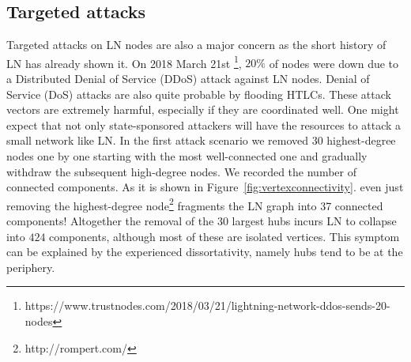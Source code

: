 \documentclass[runningheads]{llncs}
\begin{document}
\subsection{Targeted attacks}
Targeted attacks on LN nodes are also a major concern as the short history of LN has already shown it. On 2018 March 21st \footnote{https://www.trustnodes.com/2018/03/21/lightning-network-ddos-sends-20-nodes}, $20\%$ of nodes were down due to a Distributed Denial of Service (DDoS) attack against LN nodes. Denial of Service (DoS) attacks are also quite probable by flooding HTLCs. These attack vectors are extremely harmful, especially if they are coordinated well. One might expect that not only state-sponsored attackers will have the resources to attack a small network like LN. In the first attack scenario we removed 30 highest-degree nodes one by one starting with the most well-connected one and gradually withdraw the subsequent high-degree nodes. We recorded the number of connected components. As it is shown in Figure~\ref{fig:vertexconnectivity}. even just removing the highest-degree node\footnote{http://rompert.com/} fragments the LN graph into 37 connected components! Altogether the removal of the $30$ largest hubs incurs LN to collapse into $424$ components, although most of these are isolated vertices. This symptom can be explained by the experienced dissortativity, namely hubs tend to be at the periphery.     
\end{document}
